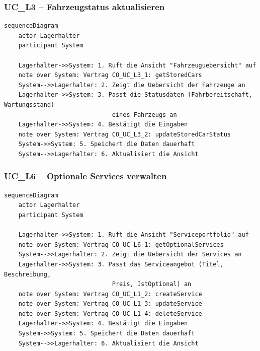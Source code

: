 \subsubsection*{UC\_L3 – Fahrzeugstatus aktualisieren}

\begin{lstlisting}[basicstyle=\ttfamily\small, breaklines=true]
sequenceDiagram
    actor Lagerhalter
    participant System

    Lagerhalter->>System: 1. Ruft die Ansicht "Fahrzeuguebersicht" auf
    note over System: Vertrag CO_UC_L3_1: getStoredCars
    System-->>Lagerhalter: 2. Zeigt die Uebersicht der Fahrzeuge an
    Lagerhalter->>System: 3. Passt die Statusdaten (Fahrbereitschaft, Wartungsstand)
                              eines Fahrzeugs an
    Lagerhalter->>System: 4. Bestätigt die Eingaben
    note over System: Vertrag CO_UC_L3_2: updateStoredCarStatus
    System->>System: 5. Speichert die Daten dauerhaft
    System-->>Lagerhalter: 6. Aktualisiert die Ansicht
\end{lstlisting}

\newpage

{}
\subsubsection*{UC\_L6 – Optionale Services verwalten}

\begin{lstlisting}[basicstyle=\ttfamily\small, breaklines=true]
sequenceDiagram
    actor Lagerhalter
    participant System

    Lagerhalter->>System: 1. Ruft die Ansicht "Serviceportfolio" auf
    note over System: Vertrag CO_UC_L6_1: getOptionalServices
    System-->>Lagerhalter: 2. Zeigt die Uebersicht der Services an
    Lagerhalter->>System: 3. Passt das Serviceangebot (Titel, Beschreibung,
                              Preis, IstOptional) an
    note over System: Vertrag CO_UC_L1_2: createService
    note over System: Vertrag CO_UC_L1_3: updateService
    note over System: Vertrag CO_UC_L1_4: deleteService
    Lagerhalter->>System: 4. Bestätigt die Eingaben
    System->>System: 5. Speichert die Daten dauerhaft
    System-->>Lagerhalter: 6. Aktualisiert die Ansicht
\end{lstlisting}

